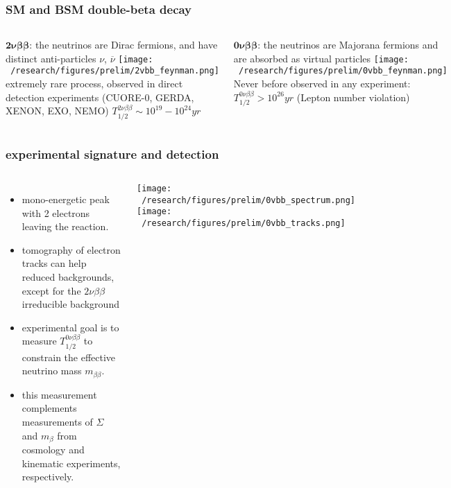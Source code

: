 \documentclass{beamer}
\begin{document}
	\begin{frame}
		\frametitle{SM and BSM double-beta decay}
		\begin{columns}[c] %
			{\footnotesize $\boldsymbol{2\nu\beta\beta}$: the neutrinos are Dirac fermions, and have distinct anti-particles $\nu$, $\overline{\nu}$} 
			\medskip
			\texttt{[image: ~/research/figures/prelim/2vbb\_feynman.png]}
			{\footnotesize extremely rare process, observed in direct detection experiments (CUORE-0, GERDA, XENON, EXO, NEMO) $T_{1/2}^{2\nu\beta\beta} \sim 10^{19}-10^{24} yr$}
			
			{\footnotesize $\boldsymbol{0\nu\beta\beta}$: the neutrinos are Majorana fermions and are absorbed as virtual particles}
			\texttt{[image: ~/research/figures/prelim/0vbb\_feynman.png]}
			{\footnotesize Never before observed in any experiment:  $T_{1/2}^{0\nu\beta\beta} > 10^{26} yr$  (Lepton number violation)}
			
		\end{columns}
	\end{frame}		
	
	\begin{frame}
		\frametitle{experimental signature and detection}
		\begin{columns}[c] %
			
			\begin{itemize}
				\setlength\itemsep{2em}
				\item mono-energetic peak with 2 electrons leaving the reaction.
				\item tomography of electron tracks can help reduced backgrounds, except for the $2\nu\beta\beta$ irreducible background
				\item experimental goal is to measure $T_{1/2}^{0\nu\beta\beta}$ to constrain the effective neutrino mass $m_{\beta\beta}$.
				\item this measurement complements measurements of $\Sigma$ and $m_{\beta}$ from cosmology and kinematic experiments, respectively.
			\end{itemize}
			
			\texttt{[image: ~/research/figures/prelim/0vbb\_spectrum.png]}
			\texttt{[image: ~/research/figures/prelim/0vbb\_tracks.png]}
			
		\end{columns}
	\end{frame}			
	
\end{document}
